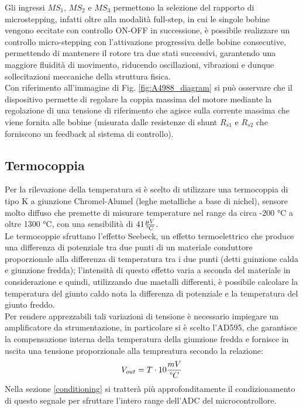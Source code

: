 \documentclass[12pt]{article}
\begin{document}
        \noindent
        Gli ingressi $MS_1$, $MS_2$ e $MS_3$ permettono la selezione del rapporto di microstepping, infatti oltre alla modalità full-step, in cui le singole bobine vengono eccitate con controllo ON-OFF in successione, è possibile realizzare un controllo micro-stepping con l'attivazione progressiva delle bobine consecutive, permettendo di mantenere il rotore tra due stati successivi, garantendo una maggiore fluidità di movimento, riducendo oscillazioni, vibrazioni e dunque sollecitazioni meccaniche della struttura fisica.\\
        Con riferimento all'immagine di Fig. \ref{fig:A4988_diagram} si può osservare che il dispositivo permette di regolare la coppia massima del motore mediante la regolazione di una tensione di riferimento che agisce sulla corrente massima che viene fornita alle bobine (misurata dalle resistenze di shunt $R_{s1}$ e $R_{s2}$ che forniscono un feedback al sistema di controllo).

        \vspace{0.1cm}


    \subsection{Termocoppia}
    Per la rilevazione della temperatura si è scelto di utilizzare una termocoppia di tipo K a giunzione Chromel-Alumel (leghe metalliche a base di nichel), sensore molto diffuso che premette di misurare temperature nel range da circa -200 °C a oltre 1300 °C, con una sensibilità di $41 \frac{\mu V}{\degree C}$.\\
    Le termocoppie sfruttano l'effetto Seebeck, un effetto termoelettrico che produce una differenza di potenziale tra due punti di un materiale conduttore proporzionale alla differenza di temperatura tra i due punti (detti guinzione calda e giunzione fredda); l'intensità di questo effetto varia a seconda del materiale in considerazione e quindi, utilizzando due maetalli differenti, è possibile calcolare la temperatura del giunto caldo nota la differenza di potenziale e la temperatura del giunto freddo.\\
    Per rendere apprezzabili tali variazioni di tensione è necessario impiegare un amplificatore da strumentazione, in particolare si è scelto l'AD595, che garantisce la compensazione interna della temperatura della giunzione fredda e fornisce in uscita una tensione proporzionale alla tempreatura secondo la relazione:
    \begin{equation}\label{thermocouple_relation_AD595}
        V_{out} = T \cdot 10 \frac{mV}{\degree C}
    \end{equation}
    Nella sezione \ref{conditioning} si tratterà più approfonditamente il condizionamento di questo segnale per sfruttare l'intero range dell'ADC del microcontrollore.
    
\end{document}
